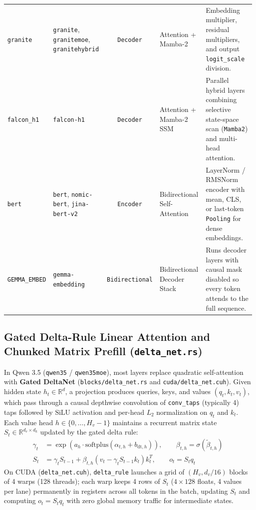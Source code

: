\documentclass[10pt,a4paper]{article}
\theoremstyle{swzstyle}
\newcommand{\code}[1]{\texttt{#1}}
\begin{document}
\begin{table}[htbp]
\begin{tabularx}{\textwidth}{@{}llclX@{}}
    \code{granite} & \code{granite}, \code{granitemoe}, \code{granitehybrid} & \code{Decoder} & Attention + Mamba-2 & Embedding multiplier, residual multipliers, and output \code{logit\_scale} division. \\
    \code{falcon\_h1} & \code{falcon-h1} & \code{Decoder} & Attention + Mamba-2 SSM & Parallel hybrid layers combining selective state-space scan (\code{Mamba2}) and multi-head attention. \\
    \code{bert} & \code{bert}, \code{nomic-bert}, \code{jina-bert-v2} & \code{Encoder} & Bidirectional Self-Attention & LayerNorm / RMSNorm encoder with mean, CLS, or last-token \code{Pooling} for dense embeddings. \\
    \code{GEMMA\_EMBED} & \code{gemma-embedding} & \code{Bidirectional} & Bidirectional Decoder Stack & Runs decoder layers with causal mask disabled so every token attends to the full sequence. \\
    \bottomrule
  \end{tabularx}
\end{table}

\subsection{Gated Delta-Rule Linear Attention and Chunked Matrix Prefill (\texttt{delta\_net.rs})}

In Qwen 3.5 (\code{qwen35} / \code{qwen35moe}), most layers replace quadratic self-attention with \textbf{Gated DeltaNet} (\code{blocks/delta\_net.rs} and \code{cuda/delta\_net.cuh}). Given hidden state $h_t \in \mathbb{R}^d$, a projection produces queries, keys, and values $(q_t, k_t, v_t)$, which pass through a causal depthwise convolution of \code{conv\_taps} (typically 4) taps followed by $\text{SiLU}$ activation and per-head $L_2$ normalization on $q_t$ and $k_t$. Each value head $h \in \{0, \dots, H_v - 1\}$ maintains a recurrent matrix state $S_t \in \mathbb{R}^{d_v \times d_k}$ updated by the gated delta rule:
\begin{align}
  \gamma_t &= \exp\!\left(a_h \cdot \text{softplus}(\alpha_{t,h} + b_{\text{dt},h})\right), \qquad \beta_{t,h} = \sigma(\tilde{\beta}_{t,h}) \\
  S_t &= \gamma_t S_{t-1} + \beta_{t,h} \left(v_t - \gamma_t S_{t-1} k_t\right) k_t^T, \qquad o_t = S_t q_t
  \label{eq:delta_rule_step}
\end{align}
On CUDA (\code{delta\_net.cuh}), \code{delta\_rule} launches a grid of $(H_v, d_v / 16)$ blocks of 4 warps (128 threads); each warp keeps 4 rows of $S_t$ ($4 \times 128$ floats, 4 values per lane) permanently in registers across all tokens in the batch, updating $S_t$ and computing $o_t = S_t q_t$ with zero global memory traffic for intermediate states.
\end{document}

